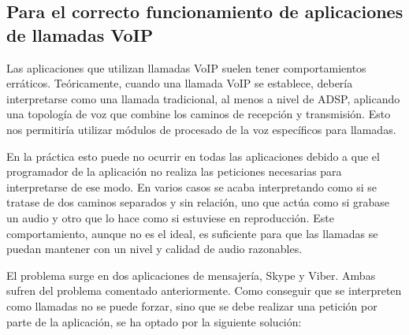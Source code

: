 \subsection{Para el correcto funcionamiento de aplicaciones de llamadas VoIP}
Las aplicaciones que utilizan llamadas \gls{VoIP} suelen tener comportamientos erráticos. Teóricamente, cuando una llamada \gls{VoIP} se establece, debería interpretarse como una llamada tradicional, al menos a nivel de \gls{ADSP}, aplicando una topología de voz que combine los caminos de recepción y transmisión. Esto nos permitiría utilizar módulos de procesado de la voz específicos para llamadas.

En la práctica esto puede no ocurrir en todas las aplicaciones debido a que el programador de la aplicación no realiza las peticiones necesarias para interpretarse de ese modo. En varios casos se acaba interpretando como si se tratase de dos caminos separados y sin relación, uno que actúa como si grabase un audio y otro que lo hace como si estuviese en reproducción. Este comportamiento, aunque no es el ideal, es suficiente para que las llamadas se puedan mantener con un nivel y calidad de audio razonables.

El problema surge en dos aplicaciones de mensajería, Skype y Viber. Ambas sufren del problema comentado anteriormente. Como conseguir que se interpreten como llamadas no se puede forzar, sino que se debe realizar una petición por parte de la aplicación, se ha optado por la siguiente solución:
	
